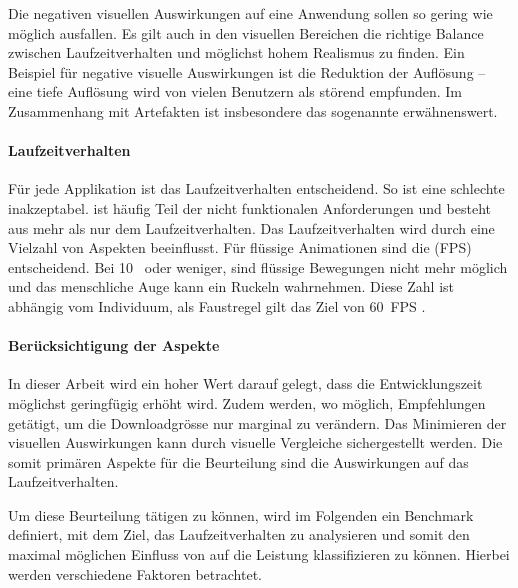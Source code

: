 Die negativen visuellen Auswirkungen auf eine Anwendung sollen so gering wie möglich ausfallen. Es gilt auch in den visuellen Bereichen die richtige Balance zwischen Laufzeitverhalten und möglichst hohem Realismus zu finden. Ein Beispiel für negative visuelle Auswirkungen ist die Reduktion der Auflösung – eine tiefe Auflösung wird von vielen Benutzern als störend empfunden. Im Zusammenhang mit  Artefakten ist insbesondere das sogenannte  erwähnenswert.

\paragraph{Laufzeitverhalten}

Für jede Applikation ist das Laufzeitverhalten entscheidend. So ist eine schlechte  inakzeptabel.  ist häufig Teil der nicht funktionalen Anforderungen und besteht aus mehr als nur dem Laufzeitverhalten.
Das Laufzeitverhalten wird durch eine Vielzahl von Aspekten beeinflusst.
Für flüssige Animationen sind die  (FPS) entscheidend. Bei 10  oder weniger, sind flüssige Bewegungen nicht mehr möglich und das menschliche Auge kann ein Ruckeln wahrnehmen. Diese Zahl ist abhängig vom Individuum, als Faustregel gilt das Ziel von 60 \gls{FPS} \cite{limitsOfHumanVision}.

\paragraph{Berücksichtigung der Aspekte}
In dieser Arbeit wird ein hoher Wert darauf gelegt, dass die Entwicklungszeit möglichst geringfügig erhöht wird. Zudem werden, wo möglich, Empfehlungen getätigt, um die Downloadgrösse nur marginal zu verändern. Das Minimieren der visuellen Auswirkungen kann durch visuelle Vergleiche sichergestellt werden.
Die somit primären Aspekte für die Beurteilung sind die Auswirkungen auf das Laufzeitverhalten.

Um diese Beurteilung tätigen zu können, wird im Folgenden ein Benchmark definiert, mit dem Ziel, das Laufzeitverhalten zu analysieren und somit den maximal möglichen Einfluss von  auf die Leistung klassifizieren zu können. Hierbei werden verschiedene Faktoren betrachtet.

